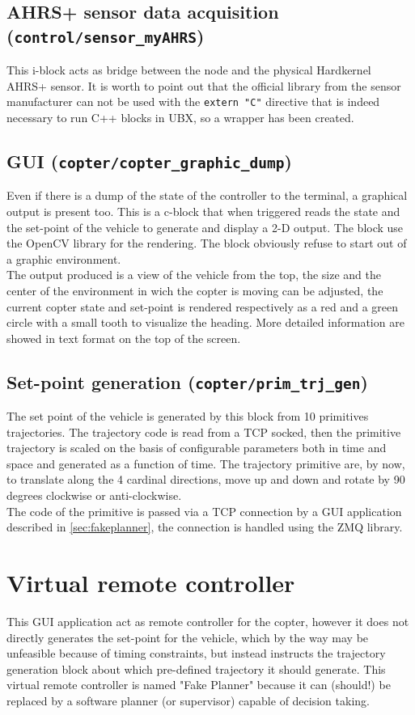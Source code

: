 \subsection{AHRS+ sensor data acquisition (\texttt{control/sensor\_myAHRS})}
This i-block acts as bridge between the node and the physical Hardkernel AHRS+ sensor. It is worth to point out that the official library from the sensor manufacturer can not be used with the \texttt{extern "C"} directive that is indeed necessary to run C++ blocks in UBX, so a wrapper has been created.

\subsection{GUI (\texttt{copter/copter\_graphic\_dump})}
Even if there is a dump of the state of the controller to the terminal, a graphical output is present too. This is a c-block that when triggered reads the state and the set-point of the vehicle to generate and display a 2-D output. The block use the OpenCV library for the rendering. The block obviously refuse to start out of a graphic environment.\\
The output produced is a view of the vehicle from the top, the size and the center of the environment in wich the copter is moving can be adjusted, the current copter state and set-point is rendered respectively as a red and a green circle with a small tooth to visualize the heading. More detailed information are showed in text format on the top of the screen.

\subsection{Set-point generation (\texttt{copter/prim\_trj\_gen})}
The set point of the vehicle is generated by this block from 10 primitives trajectories. The trajectory code is read from a TCP socked, then the primitive trajectory is scaled on the basis of configurable parameters both in time and space and generated as a function of time. The trajectory primitive are, by now, to translate along the 4 cardinal directions, move up and down and rotate by 90 degrees clockwise or anti-clockwise.\\
The code of the primitive is passed via a TCP connection by a GUI application described in \autoref{sec:fakeplanner}, the connection is handled using the ZMQ\cite{bib:ZMQ} library.

\section{Virtual remote controller}
\label{sec:fakeplanner}
 This GUI application act as remote controller for the copter, however it does not directly generates the set-point for the vehicle, which by the way may be unfeasible because of timing constraints, but instead instructs the trajectory generation block about which pre-defined trajectory it should generate. This virtual remote controller is named "Fake Planner" because it can (should!) be replaced by a software planner (or supervisor) capable of decision taking.
 